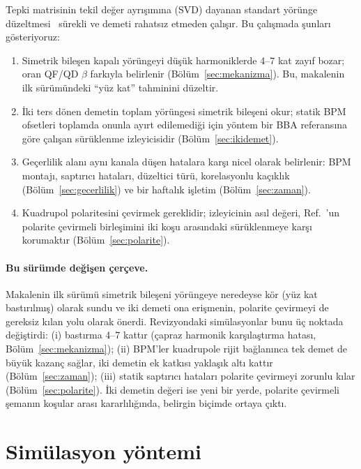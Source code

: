 \documentclass[11pt,a4paper]{article}
\begin{document}
Tepki matrisinin tekil değer ayrışımına (SVD) dayanan standart yörünge düzeltmesi~\cite{chung1993,ziemann,mirza,wegscheider}
sürekli ve demeti rahatsız etmeden çalışır. Bu çalışmada şunları gösteriyoruz:
\begin{enumerate}[nosep]
\item Simetrik bileşen kapalı yörüngeyi düşük harmoniklerde 4--7 kat zayıf bozar; oran QF/QD $\beta$ farkıyla
belirlenir (Bölüm~\ref{sec:mekanizma}). Bu, makalenin ilk sürümündeki ``yüz kat'' tahminini düzeltir.
\item İki ters dönen demetin toplam yörüngesi simetrik bileşeni okur; statik BPM ofsetleri toplamda onunla ayırt
edilemediği için yöntem bir BBA referansına göre çalışan sürüklenme izleyicisidir (Bölüm~\ref{sec:ikidemet}).
\item Geçerlilik alanı aynı kanala düşen hatalara karşı nicel olarak belirlenir: BPM montajı, saptırıcı
hataları, düzeltici türü, korelasyonlu kaçıklık (Bölüm~\ref{sec:gecerlilik}) ve bir haftalık işletim
(Bölüm~\ref{sec:zaman}).
\item Kuadrupol polaritesini çevirmek gereklidir; izleyicinin asıl değeri, Ref.~\cite{omarov}'un polarite
çevirmeli birleşimini iki koşu arasındaki sürüklenmeye karşı korumaktır (Bölüm~\ref{sec:polarite}).
\end{enumerate}

\paragraph{Bu sürümde değişen çerçeve.} Makalenin ilk sürümü simetrik bileşeni yörüngeye neredeyse kör
(yüz kat bastırılmış) olarak sundu ve iki demeti ona erişmenin, polarite çevirmeyi de gereksiz kılan yolu
olarak önerdi. Revizyondaki simülasyonlar bunu üç noktada değiştirdi: (i) bastırma 4--7 kattır (çapraz
harmonik karşılaştırma hatası, Bölüm~\ref{sec:mekanizma}); (ii) BPM'ler kuadrupole rijit bağlanınca tek demet de
büyük kazanç sağlar, iki demetin ek katkısı yaklaşık altı kattır (Bölüm~\ref{sec:zaman}); (iii) statik
saptırıcı hataları polarite çevirmeyi zorunlu kılar (Bölüm~\ref{sec:polarite}). İki demetin değeri ise yeni bir
yerde, polarite çevirmeli şemanın koşular arası kararlılığında, belirgin biçimde ortaya çıktı.

\section{Simülasyon yöntemi}
\end{document}
